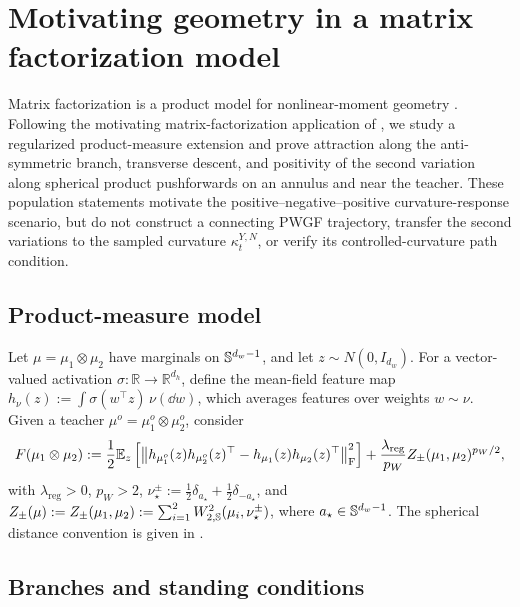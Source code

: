 \section{Motivating geometry in a matrix factorization model}
\label{sec:matrix-factorization}

Matrix factorization is a product model for nonlinear-moment geometry
\citep{kolda2009tensor,sidiropoulos2017tensor,anandkumar2014tensor}.
Following the motivating matrix-factorization application of
\citet{yamamoto2025hessianguided}, we study a regularized product-measure
extension and prove attraction along the anti-symmetric branch, transverse
descent, and positivity of the second variation along spherical product
pushforwards on an annulus and near the teacher. These population statements motivate the
positive--negative--positive curvature-response scenario, but do not construct
a connecting PWGF trajectory, transfer the second variations to the sampled
curvature \(\kappa_t^{Y,N}\), or verify its controlled-curvature path condition.

\subsection{Product-measure model}
\label{subsec:mf-model}

Let \(\mu=\mu_1\otimes\mu_2\) have marginals on \(\mathbb{S}^{d_w-1}\),
and let \(z\sim N(0,I_{d_w})\).
For a vector-valued activation \(\sigma:\mathbb R\to\mathbb R^{d_h}\), define
the mean-field feature map
\(h_\nu(z):=\int\sigma(w^\top z)\,\nu(\dd w)\),
which averages features over weights \(w\sim\nu\).
Given a teacher \(\mu^o=\mu_1^o\otimes\mu_2^o\), consider
\begin{equation}
    F(\mu_1\otimes\mu_2)
    :=
    \frac12\mathbb{E}_z\left[
        \left\|h_{\mu^o_1}(z)h_{\mu^o_2}(z)^\top
        -h_{\mu_1}(z)h_{\mu_2}(z)^\top\right\|_{\mathrm F}^2
    \right]
    +
    \frac{\lambda_{\mathrm{reg}}}{p_W}Z_\pm(\mu_1,\mu_2)^{p_W/2},
    \label{eq:mf-objective}
\end{equation}
with \(\lambda_{\mathrm{reg}}>0\), \(p_W>2\),
\(\nu_\star^\pm:=\tfrac12\delta_{a_\star}+\tfrac12\delta_{-a_\star}\),
and \(Z_\pm(\mu):=Z_\pm(\mu_1,\mu_2):=\sum_{i=1}^2
W_{2,\mathbb{S}}^2(\mu_i,\nu_\star^\pm)\), where
\(a_\star\in\mathbb{S}^{d_w-1}\).
The spherical distance convention is given in
.

\subsection{Branches and standing conditions}
\label{subsec:active-moments}

